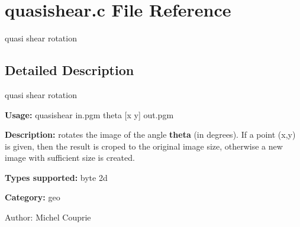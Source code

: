 \section{quasishear.c File Reference}
\label{quasishear_8c}
quasi shear rotation  




\label{_details}
\subsection{Detailed Description}
quasi shear rotation 

{\bf Usage:} quasishear in.pgm theta [x y] out.pgm

{\bf Description:} rotates the image of the angle {\bf theta} (in degrees). If a point (x,y) is given, then the result is croped to the original image size, otherwise a new image with sufficient size is created.

{\bf Types supported:} byte 2d

{\bf Category:} geo

\begin{Desc}
\item[Author:]Michel Couprie \end{Desc}
